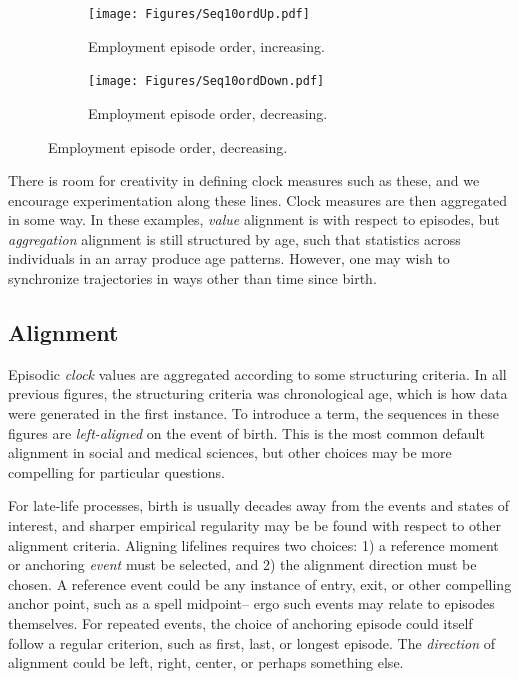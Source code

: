 \documentclass{article}
\begin{document}
\begin{figure}[ht!]
\centering
\caption{Employment episodes from Figure~\ref{fig:seq10}
are imputed with order count variables.}
\label{fig:order}

\begin{subfigure}{\textwidth}
\caption{Employment episode order, increasing.}
\label{fig:orderup}
\texttt{[image: Figures/Seq10ordUp.pdf]}
\end{subfigure}

\begin{subfigure}{\textwidth}
\caption{Employment episode order, decreasing.}
\label{fig:orderdown}
\texttt{[image: Figures/Seq10ordDown.pdf]}
\end{subfigure}

\end{figure}

There is room for creativity in defining clock measures such as these, and we encourage experimentation along these lines. Clock measures are then aggregated in some way. In these examples, \emph{value} alignment is with respect to episodes, but \emph{aggregation} alignment is still structured by age, such that statistics across individuals in an array produce age patterns. However, one may wish to synchronize trajectories in ways other than time since birth.

\FloatBarrier
\subsection{Alignment}
\label{sec:align}
Episodic \emph{clock} values are aggregated according to some structuring criteria. In all previous figures, the structuring criteria was chronological age, which is how data were generated in the first instance. To introduce a term, the sequences in these figures are \emph{left-aligned} on the event of birth. This is the most common default alignment in social and medical sciences, but other choices may be more compelling for particular questions.

For late-life processes, birth is usually decades away from the events and states of interest, and sharper empirical regularity may be be found with respect to other alignment criteria. Aligning lifelines requires two choices: 1) a reference moment or anchoring \emph{event} must be selected, and 2) the alignment direction must be chosen. A reference event could be any instance of entry, exit, or other compelling anchor point, such as a spell midpoint-- ergo such events may relate to episodes themselves. For repeated events, the choice of anchoring episode could itself follow a regular criterion, such as first, last, or longest episode. The \emph{direction} of alignment could be left, right, center, or perhaps something else.
\end{document}
